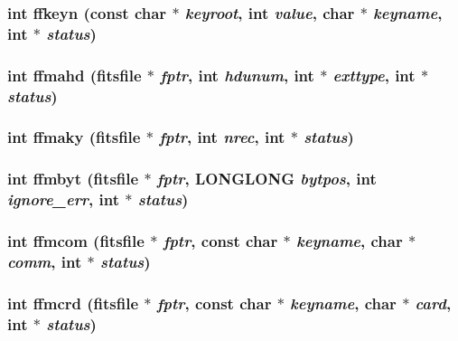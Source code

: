 \subsubsection{\setlength{\rightskip}{0pt plus 5cm}int ffkeyn (const char $\ast$ {\em keyroot}, int {\em value}, char $\ast$ {\em keyname}, int $\ast$ {\em status})}\label{fitsio_8h_8439e81e5e5ec5d57530c44db55ff774}


\subsubsection{\setlength{\rightskip}{0pt plus 5cm}int ffmahd (\bf{fitsfile} $\ast$ {\em fptr}, int {\em hdunum}, int $\ast$ {\em exttype}, int $\ast$ {\em status})}\label{fitsio_8h_bf55072a6e71f57598a83d1b89d9ac4d}


\subsubsection{\setlength{\rightskip}{0pt plus 5cm}int ffmaky (\bf{fitsfile} $\ast$ {\em fptr}, int {\em nrec}, int $\ast$ {\em status})}\label{fitsio_8h_7a704bb29df41ba2926bf18398ac67bf}


\subsubsection{\setlength{\rightskip}{0pt plus 5cm}int ffmbyt (\bf{fitsfile} $\ast$ {\em fptr}, \bf{LONGLONG} {\em bytpos}, int {\em ignore\_\-err}, int $\ast$ {\em status})}\label{fitsio_8h_d46d8495fae664fff9a6e7307bec570f}


\subsubsection{\setlength{\rightskip}{0pt plus 5cm}int ffmcom (\bf{fitsfile} $\ast$ {\em fptr}, const char $\ast$ {\em keyname}, char $\ast$ {\em comm}, int $\ast$ {\em status})}\label{fitsio_8h_e21b2574f5fb36c2e208473ec81c6f18}


\subsubsection{\setlength{\rightskip}{0pt plus 5cm}int ffmcrd (\bf{fitsfile} $\ast$ {\em fptr}, const char $\ast$ {\em keyname}, char $\ast$ {\em card}, int $\ast$ {\em status})}\label{fitsio_8h_0fb8a002759b6bdaa863bb456a57ad93}


